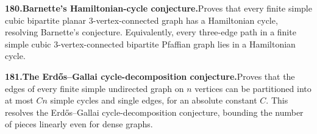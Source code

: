 \documentclass[11pt,a4paper]{article}
\begin{document}
  \par \begin{minipage}{\linewidth}
  \fontsize{10.5}{12.6}\selectfont\RaggedRight
  \hypertarget{result 180}{}
  {\bfseries\textcolor{muted}{180.}\enspace Barnette's Hamiltonian-cycle conjecture.}\enspace Proves that every finite simple cubic bipartite planar $3$-vertex-connected graph has a Hamiltonian cycle, resolving Barnette's conjecture. Equivalently, every three-edge path in a finite simple cubic $3$-vertex-connected bipartite Pfaffian graph lies in a Hamiltonian cycle.\par
  \end{minipage}\par\vspace{5pt}



  \par \begin{minipage}{\linewidth}
  \fontsize{10.5}{12.6}\selectfont\RaggedRight
  \hypertarget{result 181}{}
  {\bfseries\textcolor{muted}{181.}\enspace The Erd\H{o}s--Gallai cycle-decomposition conjecture.}\enspace Proves that the edges of every finite simple undirected graph on $n$ vertices can be partitioned into at most $Cn$ simple cycles and single edges, for an absolute constant $C$. This resolves the Erd\H{o}s--Gallai cycle-decomposition conjecture, bounding the number of pieces linearly even for dense graphs.\par
  \end{minipage}\par\vspace{5pt}
\end{document}
